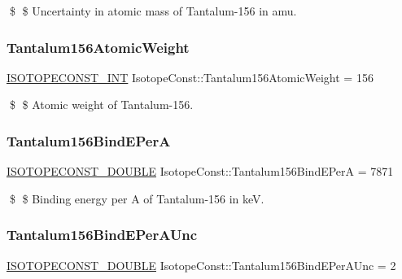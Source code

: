\$ \$ Uncertainty in atomic mass of Tantalum-\/156 in amu. \mbox{\label{group___isotope_const-_tantalum-_ta156_ga022e0d3c37767d67386eae5b5e6bc682}} 
\subsubsection{\texorpdfstring{Tantalum156\+Atomic\+Weight}{Tantalum156AtomicWeight}}
{\footnotesize\ttfamily \mbox{\hyperlink{group___isotope_const-_macros_ga5f18360b3e99483a35c32d789e62621c}{I\+S\+O\+T\+O\+P\+E\+C\+O\+N\+S\+T\+\_\+\+I\+NT}} Isotope\+Const\+::\+Tantalum156\+Atomic\+Weight = 156}

\$ \$ Atomic weight of Tantalum-\/156. \mbox{\label{group___isotope_const-_tantalum-_ta156_ga7b5dbf096a41d56af6356f42815cc183}} 
\subsubsection{\texorpdfstring{Tantalum156\+Bind\+E\+PerA}{Tantalum156BindEPerA}}
{\footnotesize\ttfamily \mbox{\hyperlink{group___isotope_const-_macros_ga8f45a7272ce02c0b4c65c44636ed719a}{I\+S\+O\+T\+O\+P\+E\+C\+O\+N\+S\+T\+\_\+\+D\+O\+U\+B\+LE}} Isotope\+Const\+::\+Tantalum156\+Bind\+E\+PerA = 7871}

\$ \$ Binding energy per A of Tantalum-\/156 in keV. \mbox{\label{group___isotope_const-_tantalum-_ta156_gab5647754e0b2a22f54b7e6056838b253}} 
\subsubsection{\texorpdfstring{Tantalum156\+Bind\+E\+Per\+A\+Unc}{Tantalum156BindEPerAUnc}}
{\footnotesize\ttfamily \mbox{\hyperlink{group___isotope_const-_macros_ga8f45a7272ce02c0b4c65c44636ed719a}{I\+S\+O\+T\+O\+P\+E\+C\+O\+N\+S\+T\+\_\+\+D\+O\+U\+B\+LE}} Isotope\+Const\+::\+Tantalum156\+Bind\+E\+Per\+A\+Unc = 2}

